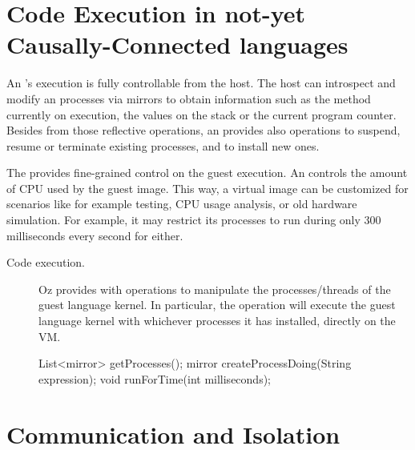 \section{Code Execution in not-yet Causally-Connected languages} \label{sec:execution}

An \objectspace's execution is fully controllable from the host. The host can introspect and modify an \objectspace processes via mirrors to obtain information such as the method currently on execution, the values on the stack or the current program counter. Besides from those reflective operations, an \objectspace provides also operations to suspend, resume or terminate existing processes, and to install new ones.

The \objectspace provides fine-grained control on the guest execution. An \objectspace controls the amount of CPU used by the guest image. This way, a virtual image can be customized for scenarios like for example testing, CPU usage analysis, or old hardware simulation. For example, it may restrict its processes to run during only 300 milliseconds every second for either.


\begin{description}
\item[Code execution.] Oz provides with operations to manipulate the processes/threads of the guest language kernel. In particular, the  operation will execute the guest language kernel with whichever processes it has installed, directly on the VM.
\begin{code}
List<mirror> getProcesses();
mirror createProcessDoing(String expression);
void runForTime(int milliseconds);
\end{code}
\end{description}

\section{Communication and Isolation} \label{sec:communication}\label{sec:isolation}


